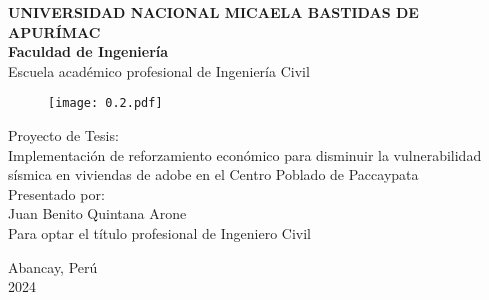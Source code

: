 
\begin{titlepage}

	\begin{center}
		\textbf{\large{UNIVERSIDAD NACIONAL MICAELA BASTIDAS DE APURÍMAC}}\\
		\vspace{2mm}
		\large{\textbf{Faculdad de Ingeniería}}\\
		\vspace{2mm}
		\large{\textbf{}{Escuela académico profesional de Ingeniería Civil}}\\
		\vspace{5mm}
		\begin{figure}[h!]
			\centering
			\texttt{[image: 0.2.pdf]}
		\end{figure}
		
		\vspace{5mm}
		\large{Proyecto de Tesis:}\\
		Implementación de reforzamiento económico para disminuir la vulnerabilidad sísmica en viviendas de adobe en el Centro Poblado de Paccaypata\\
		\vspace{10mm}
		Presentado por:\\
		\vspace{10mm}
		Juan Benito Quintana Arone\\
		\vspace{5mm}
		Para optar el título profesional de Ingeniero Civil 
		
		\vspace{10mm}
		
		\vfill
		Abancay, Perú\\
		\vspace{5mm}
		2024\\
	\end{center}
\end{titlepage}

